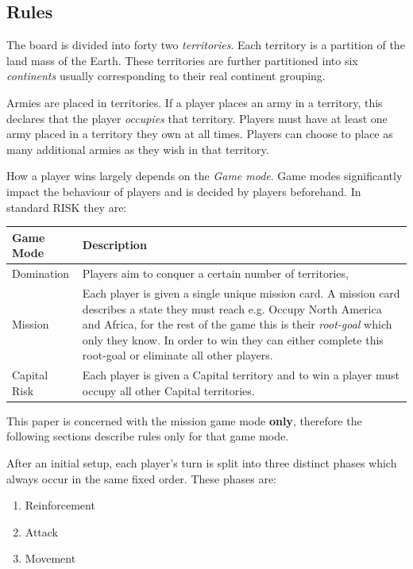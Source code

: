 \documentclass[parskip]{cs4rep}
\begin{document}
\subsection{Rules}

The board is divided into forty two \textit{territories}. Each territory is a partition of the land mass of the Earth. These territories are further partitioned into six \textit{continents} usually corresponding to their real continent grouping.

Armies are placed in territories. If a player places an army in a territory, this declares that the player \textit{occupies} that territory. Players must have at least one army placed in a territory they own at all times. Players can choose to place as many additional armies as they wish in that territory.

How a player wins largely depends on the \textit{Game mode}. Game modes significantly impact the behaviour of players and is decided by players beforehand. In standard RISK they are:
\newline

\begin{tabular}{|l|p{11cm}|}
\hline 
\textbf{Game Mode} & \textbf{Description} \\ 
\hline 
Domination & Players aim to conquer a certain number of territories, \\ 
\hline 
Mission & Each player is given a single unique mission card. A mission card describes a state they must reach e.g. Occupy North America and Africa, for the rest of the game this is their \textit{root-goal} which only they know. In order to win they can either complete this root-goal or eliminate all other players. \\ 
\hline 
Capital Risk & Each player is given a Capital territory and to win a player must occupy all other Capital territories. \\ 
\hline
\end{tabular} 
\newline

This paper is concerned with the mission game mode \textbf{only}, therefore the following sections describe rules only for that game mode.

After an initial setup, each player's turn is split into three distinct phases which always occur in the same fixed order. These phases are:

\begin{enumerate}
\item
Reinforcement
\item
Attack
\item
Movement
\newline
\end{enumerate}
\end{document}
